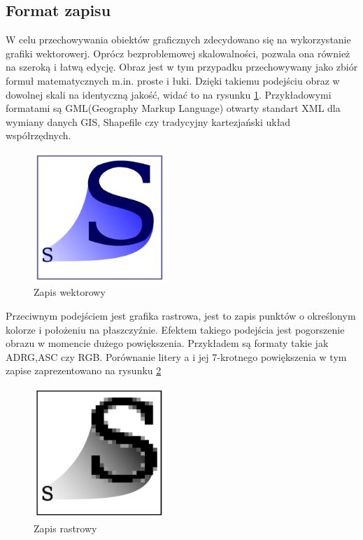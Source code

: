 \subsection{Format zapisu}
\label{subsec:zapisWektorowy}

W celu przechowywania obiektów graficznych zdecydowano się na wykorzystanie grafiki wektorowerj. Oprócz bezproblemowej skalowalności, pozwala ona również na szeroką i łatwą edycję.
Obraz jest w tym przypadku przechowywany jako zbiór formuł matematycznych m.in. proste i łuki. Dzięki takiemu podejściu obraz w dowolnej skali na identyczną jakość, widać to na rysunku \ref{fig:wekt}. Przykładowymi formatami są GML(Geography Markup Language) otwarty standart XML dla wymiany danych GIS, Shapefile czy tradycyjny kartezjański układ współrzędnych.

  \begin{figure}[H]
  \centering
    \includegraphics[width=50mm]{ge/a1.jpg}
  \caption{Zapis wektorowy}
  \label{fig:wekt}
  \end{figure}

Przeciwnym podejściem jest grafika rastrowa, jest to zapis punktów o określonym kolorze i położeniu na płaszczyźnie.  Efektem takiego podejścia jest pogorszenie obrazu w momencie dużego powiększenia. Przykładem są formaty takie jak ADRG,ASC czy RGB.
Porównanie litery a i jej 7-krotnego powiększenia w tym zapise zaprezentowano na rysunku \ref{fig:rast}
  \begin{figure}[H]
  \centering
    \includegraphics[width=50mm]{ge/a2.jpg}
  \caption{Zapis rastrowy}
  \label{fig:rast}
  \end{figure}

